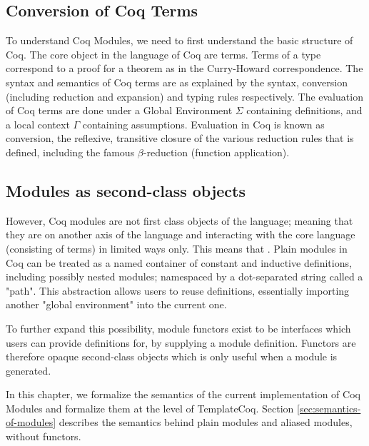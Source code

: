 \subsection{Conversion of Coq Terms}

To understand Coq Modules, we need to first understand the basic structure of
Coq. The core object in the language of Coq are terms. Terms of a type
correspond to a proof for a theorem as in the Curry-Howard correspondence.  The
syntax and semantics of Coq terms are as explained by the syntax,
 conversion (including reduction and expansion)
 and typing
rules respectively. The evaluation of Coq terms are done under a Global Environment
$\Sigma$ containing definitions, and a local context $\Gamma$ containing
assumptions. Evaluation in Coq is known as conversion, the reflexive, transitive
closure of the various reduction rules that is defined, including the famous
$\beta$-reduction (function application).

\subsection{Modules as second-class objects}
However, Coq modules are not first class objects of the language; meaning that
they are on another axis of the language and interacting with the core language
(consisting of terms) in limited ways only. This means that .
Plain modules in Coq can be treated as a named container of constant
and inductive definitions, including possibly nested modules; namespaced by a 
dot-separated string called a "path". This abstraction allows users to reuse
definitions, essentially importing another "global environment" into the current
one.

To further expand this possibility, module functors exist to be interfaces which
users can provide definitions for, by supplying a module definition. Functors
are therefore opaque second-class objects which is only useful when a module is
generated.

In this chapter, we formalize the semantics of the current implementation of Coq
Modules and formalize them at the level of TemplateCoq. Section
\ref{sec:semantics-of-modules} describes the semantics behind plain modules and
aliased modules, without functors.

